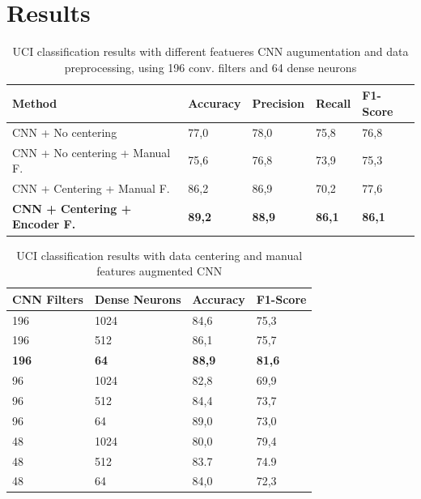 
\section{Results}
\label{sec:results}

\begin{table}[t]
	\begin{center}
		\begin{tabular}{ p{7cm}p{2cm}p{2cm}p{2cm}p{2cm} } 
			\hline
			Method & Accuracy & Precision & Recall & F1-Score \\ 
			\hline
			CNN + No centering & 77,0 & 78,0 & 75,8 & 76,8 \\ 
			CNN + No centering + Manual F. & 75,6 & 76,8 & 73,9 & 75,3 \\
			CNN + Centering + Manual F. & 86,2 & 86,9 & 70,2 & 77,6 \\ 
			\textbf{CNN + Centering + Encoder F.} & \textbf{89,2} & \textbf{88,9} &  \textbf{86,1} & \textbf{86,1} \\ 
			\hline
		\end{tabular}
	\caption{\label{tab:model-performance} UCI classification results with different featueres CNN augumentation and data preprocessing, using 196 conv. filters and 64 dense neurons}
	\end{center}
\end{table}

\begin{table}
	\begin{center}
		\begin{tabular}{ p{1.8cm}p{1.7cm}p{1.7cm}p{1.7cm} } 
			\hline
			CNN Filters & Dense Neurons & Accuracy & F1-Score \\ 
			\hline
			196 & 1024 & 84,6 & 75,3 \\
			196 & 512 & 86,1 & 75,7 \\ 
			\textbf{196} & \textbf{64} & \textbf{88,9} & \textbf{81,6} \\ 
			96 & 1024 & 82,8 & 69,9 \\
			96 & 512 & 84,4 & 73,7 \\ 
			96 & 64 & 89,0 & 73,0 \\  
			48 & 1024 & 80,0 & 79,4 \\
			48 & 512 & 83.7 & 74.9 \\ 
			48 & 64 & 84,0 & 72,3 \\
			\hline
		\end{tabular}
	\caption{\label{tab:model-selection} UCI classification results with data centering and manual features augmented CNN}
	\end{center}
\end{table}

